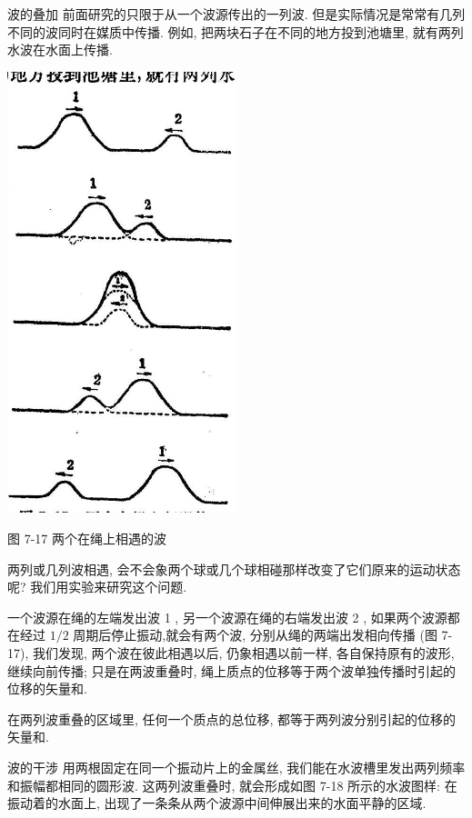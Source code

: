 \documentclass[10pt]{article}
\begin{document}
波的叠加 前面研究的只限于从一个波源传出的一列波. 但是实际情况是常常有几列不同的波同时在媒质中传播. 例如, 把两块石子在不同的地方投到池塘里, 就有两列水波在水面上传播.

\begin{center}
\includegraphics[max width=0.5\textwidth]{images/01912d55-147c-70aa-b0e0-1782a122f948_213_806335.jpg}
\end{center}

图 7-17 两个在绳上相遇的波

两列或几列波相遇, 会不会象两个球或几个球相碰那样改变了它们原来的运动状态呢? 我们用实验来研究这个问题.

一个波源在绳的左端发出波 1 , 另一个波源在绳的右端发出波 2 , 如果两个波源都在经过 \(1/2\) 周期后停止振动,就会有两个波, 分别从绳的两端出发相向传播 (图 7-17), 我们发现, 两个波在彼此相遇以后, 仍象相遇以前一样, 各自保持原有的波形, 继续向前传播; 只是在两波重叠时, 绳上质点的位移等于两个波单独传播时引起的位移的矢量和.

在两列波重叠的区域里, 任何一个质点的总位移, 都等于两列波分别引起的位移的矢量和.

波的干涉 用两根固定在同一个振动片上的金属丝, 我们能在水波槽里发出两列频率和振幅都相同的圆形波. 这两列波重叠时, 就会形成如图 7-18 所示的水波图样: 在振动着的水面上, 出现了一条条从两个波源中间伸展出来的水面平静的区域.
\end{document}
